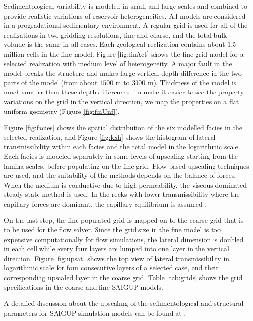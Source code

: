 Sedimentological variability is modeled in small and large scales and combined
to provide realistic variations of reservoir heterogeneities.  All models are considered in a progradational sedimentary environment. A regular grid is used for all of the realizations in two gridding resolutions, fine and coarse, and the total bulk volume is the same in all cases. Each geological realization contains about $1.5$ million cells in the fine model. Figure \ref{fig:finAct} shows the fine grid model for a selected realization with medium level of heterogeneity. A major fault in the model breaks the structure and makes large vertical depth difference in the two parts of the model (from about $1500$ m to $3000$ m).  Thickness of the model is much smaller than these depth differences. To make it easier to see the property variations on the grid in the vertical direction, we map the properties on a flat uniform geometry (Figure \ref{fig:finUnf}).

Figure \ref{fig:facies} shows the spatial distribution of the six modelled facies in the selected realization, and Figure \ref{fig:kxh} shows the histogram of lateral transmissibility within each facies and the total model in the logarithmic scale. Each facies is modeled separately in some levels of upscaling starting from the lamina scales, before populating on the fine grid. Flow based upscaling techniques are used, and the suitability of the methods depends on the balance of
forces. When the medium is conductive due to high permeability, the viscous dominated steady state method is used. In the rocks with lower transmissibility where the capillary forces are dominant, the capillary equilibrium is assumed \cite{manzocchi2008sensitivity}.

On the last step, the fine populated grid is mapped on to the coarse grid that is to be used for the flow solver. Since the grid size in the fine model is too expensive computationally for flow simulations, the lateral dimension is doubled in each cell while every four layers are lumped into one layer in the vertical direction. Figure \ref{fig:upsat} shows the top view of lateral transmissibility in logarithmic scale for four consecutive layers of a selected case, and their corresponding upscaled layer in the coarse grid. Table \ref{tab:grids} shows the grid specifications in the coarse and fine SAIGUP models.

A detailed discussion about the upscaling of the sedimentological and structural parameters for SAIGUP simulation models can be found at \cite{manzocchi2008sensitivity}.

